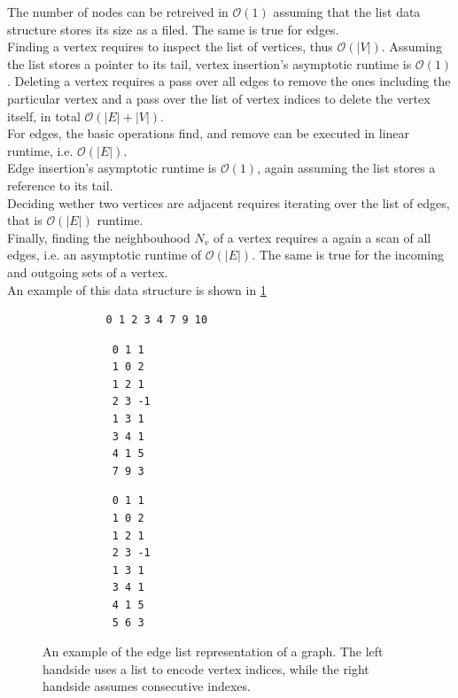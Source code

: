         The number of nodes can be retreived in $\mathcal{O}(1)$ assuming that the list data structure stores its size as a filed. 
        The same is true for edges.\\

        Finding a vertex requires to inspect the list of vertices, thus $\mathcal{O}(|V|)$. 
        Assuming the list stores a pointer to its tail, vertex insertion's asymptotic runtime is $\mathcal{O}(1)$. 
        Deleting a vertex requires a pass over all edges to remove the ones including the particular vertex and a pass over the list of vertex indices to delete the vertex itself, in total $\mathcal{O}(|E|+|V|)$. \\
        For edges, the basic operations find, and remove can be executed in linear runtime, i.e. $\mathcal{O}(|E|)$. \\
        Edge insertion's asymptotic runtime is $\mathcal{O}(1)$, again assuming the list stores a reference to its tail. \\
        
        Deciding wether two vertices are adjacent requires iterating over the list of edges, that is 
        $\mathcal{O}(|E|)$ runtime.\\
        
        Finally, finding the neighbouhood $N_v$ of a vertex requires a again a scan of all edges, i.e. an asymptotic runtime of $\mathcal{O}(|E|)$. 
        The same is true for the incoming and outgoing sets of a vertex. \\
        
        An example of this data structure is shown in \ref{edgelist}
        
        \begin{figure}[htp]\label{edgelist}
         \begin{center}
         \begin{minipage}{0.5\textwidth}
         \begin{verbatim}
          0 1 2 3 4 7 9 10
          \end{verbatim}
          \begin{verbatim}
           0 1 1
           1 0 2
           1 2 1
           2 3 -1
           1 3 1
           3 4 1
           4 1 5
           7 9 3
          \end{verbatim}
         \end{minipage}%
         \hfill%
         \begin{minipage}{0.5\textwidth}
          \begin{verbatim}
           0 1 1
           1 0 2
           1 2 1
           2 3 -1
           1 3 1
           3 4 1
           4 1 5
           5 6 3
          \end{verbatim}
         \end{minipage}
         \end{center}
         \caption{%
             An example of the edge list representation of a graph.%
             The left handside uses a list to encode vertex indices, while the right handside assumes consecutive indexes.%
        }
        \end{figure}


